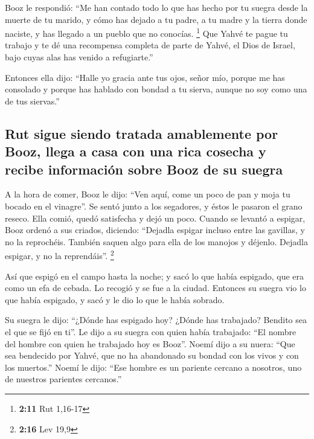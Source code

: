 \begin{paracol}{2}
 Booz le respondió: ``Me han contado todo lo que has
hecho por tu suegra desde la muerte de tu marido, y cómo has dejado a tu
padre, a tu madre y la tierra donde naciste, y has llegado a un pueblo
que no conocías. \footnote{\textbf{2:11} Rut 1,16-17} 
Que Yahvé te pague tu trabajo y te dé una recompensa completa de parte
de Yahvé, el Dios de Israel, bajo cuyas alas has venido a refugiarte.''

 Entonces ella dijo: ``Halle yo gracia ante tus ojos,
señor mío, porque me has consolado y porque has hablado con bondad a tu
sierva, aunque no soy como una de tus siervas.''

\hypertarget{rut-sigue-siendo-tratada-amablemente-por-booz-llega-a-casa-con-una-rica-cosecha-y-recibe-informaciuxf3n-sobre-booz-de-su-suegra}{%
\subsection{Rut sigue siendo tratada amablemente por Booz, llega a casa
con una rica cosecha y recibe información sobre Booz de su
suegra}\label{rut-sigue-siendo-tratada-amablemente-por-booz-llega-a-casa-con-una-rica-cosecha-y-recibe-informaciuxf3n-sobre-booz-de-su-suegra}}

 A la hora de comer, Booz le dijo: ``Ven aquí, come un
poco de pan y moja tu bocado en el vinagre''. Se sentó junto a los
segadores, y éstos le pasaron el grano reseco. Ella comió, quedó
satisfecha y dejó un poco.  Cuando se levantó a espigar,
Booz ordenó a sus criados, diciendo: ``Dejadla espigar incluso entre las
gavillas, y no la reprochéis.  También saquen algo para
ella de los manojos y déjenlo. Dejadla espigar, y no la reprendáis''.
\footnote{\textbf{2:16} Lev 19,9}

 Así que espigó en el campo hasta la noche; y sacó lo que
había espigado, que era como un efa de cebada.  Lo
recogió y se fue a la ciudad. Entonces su suegra vio lo que había
espigado, y sacó y le dio lo que le había sobrado.

 Su suegra le dijo: ``¿Dónde has espigado hoy? ¿Dónde has
trabajado? Bendito sea el que se fijó en ti''. Le dijo a su suegra con
quien había trabajado: ``El nombre del hombre con quien he trabajado hoy
es Booz''.  Noemí dijo a su nuera: ``Que sea bendecido
por Yahvé, que no ha abandonado su bondad con los vivos y con los
muertos.'' Noemí le dijo: ``Ese hombre es un pariente cercano a
nosotros, uno de nuestros parientes cercanos.''


\end{paracol}
